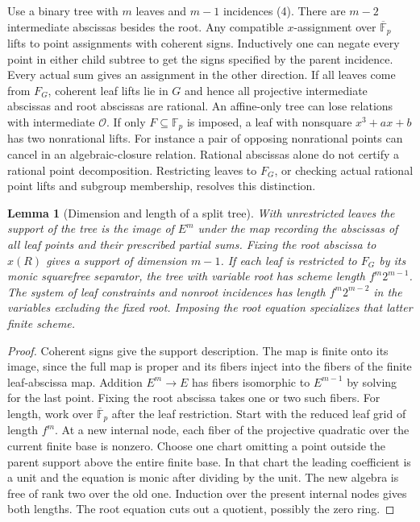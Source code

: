 \documentclass[11pt]{article}
\newtheorem{lemma}[theorem]{Lemma}
\newcommand{\Fp}{\mathbb F_p}
\newcommand{\kb}{\overline{\mathbb F}_p}
\newcommand{\OO}{\mathcal O}
\begin{document}
Use a binary tree with \(m\) leaves and \(m-1\) incidences (4). There are \(m-2\) intermediate abscissas besides the root. Any compatible \(x\)-assignment over \(\kb\) lifts to point assignments with coherent signs. Inductively one can negate every point in either child subtree to get the signs specified by the parent incidence. Every actual sum gives an assignment in the other direction. If all leaves come from \(F_G\), coherent leaf lifts lie in \(G\) and hence all projective intermediate abscissas and root abscissas are rational. An affine-only tree can lose relations with intermediate \(\OO\). If only \(F\subseteq\Fp\) is imposed, a leaf with nonsquare \(x^3+ax+b\) has two nonrational lifts. For instance a pair of opposing nonrational points can cancel in an algebraic-closure relation. Rational abscissas alone do not certify a rational point decomposition. Restricting leaves to \(F_G\), or checking actual rational point lifts and subgroup membership, resolves this distinction.

\begin{lemma}[Dimension and length of a split tree]
With unrestricted leaves the support of the tree is the image of \(E^m\) under the map recording the abscissas of all leaf points and their prescribed partial sums. Fixing the root abscissa to \(x(R)\) gives a support of dimension \(m-1\). If each leaf is restricted to \(F_G\) by its monic squarefree separator, the tree with variable root has scheme length \(f^m2^{m-1}\). The system of leaf constraints and nonroot incidences has length \(f^m2^{m-2}\) in the variables excluding the fixed root. Imposing the root equation specializes that latter finite scheme.
\end{lemma}
\begin{proof}
Coherent signs give the support description. The map is finite onto its image, since the full map is proper and its fibers inject into the fibers of the finite leaf-abscissa map. Addition \(E^m\to E\) has fibers isomorphic to \(E^{m-1}\) by solving for the last point. Fixing the root abscissa takes one or two such fibers. For length, work over \(\kb\) after the leaf restriction. Start with the reduced leaf grid of length \(f^m\). At a new internal node, each fiber of the projective quadratic over the current finite base is nonzero. Choose one chart omitting a point outside the parent support above the entire finite base. In that chart the leading coefficient is a unit and the equation is monic after dividing by the unit. The new algebra is free of rank two over the old one. Induction over the present internal nodes gives both lengths. The root equation cuts out a quotient, possibly the zero ring.
\end{proof}
\end{document}

